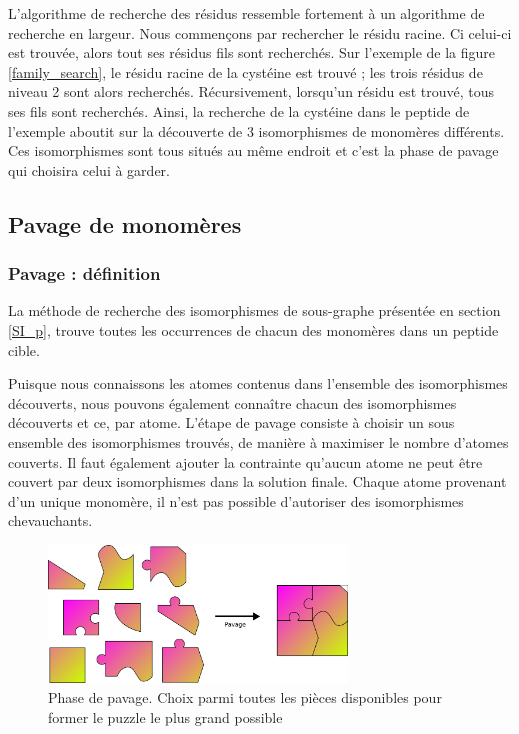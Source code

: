 L'algorithme de recherche des résidus ressemble fortement à un algorithme de recherche en largeur.
Nous commençons par rechercher le résidu racine.
Ci celui-ci est trouvée, alors tout ses résidus fils sont recherchés.
Sur l'exemple de la figure \ref{family_search}, le résidu racine de la cystéine est trouvé ; les trois résidus de niveau 2 sont alors recherchés.
Récursivement, lorsqu'un résidu est trouvé, tous ses fils sont recherchés.
Ainsi, la recherche de la cystéine dans le peptide de l'exemple aboutit sur la découverte de 3 isomorphismes de monomères différents.
Ces isomorphismes sont tous situés au même endroit et c'est la phase de pavage qui choisira celui à garder.


\subsection{Pavage de monomères}
\label{pavage_}

\subsubsection{Pavage : définition}

La méthode de recherche des isomorphismes de sous-graphe présentée en section \ref{SI_p}, trouve toutes les occurrences de chacun des monomères dans un peptide cible.

Puisque nous connaissons les atomes contenus dans l'ensemble des isomorphismes découverts, nous pouvons également connaître chacun des isomorphismes découverts et ce, par atome.
L'étape de pavage consiste à choisir un sous ensemble des isomorphismes trouvés, de manière à maximiser le nombre d'atomes couverts.
Il faut également ajouter la contrainte qu'aucun atome ne peut être couvert par deux isomorphismes dans la solution finale.
Chaque atome provenant d'un unique monomère, il n'est pas possible d'autoriser des isomorphismes chevauchants.

\begin{figure}[!ht]
  \begin{center}
    \includegraphics[width=300px]{Figures/s2m/pavage/puzzle.png}
    \caption{\label{puzzle}Phase de pavage.
    Choix parmi toutes les pièces disponibles pour former le puzzle le plus grand possible}
  \end{center}
\end{figure}

